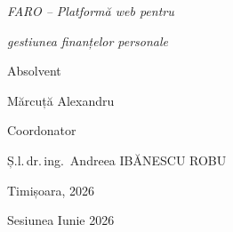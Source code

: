 \documentclass[12pt,a4paper,oneside]{report}
\begin{document}
\begin{titlepage}
  {\Large\itshape FARO -- Platformă web pentru\par}
  \vspace{0.15cm}
  {\Large\itshape gestiunea finanțelor personale\par}

  \vspace{2.2cm}

  \begin{flushright}
    {\large Absolvent\par}
    \vspace{0.1cm}
    {\large Mărcuță Alexandru\par}
  \end{flushright}

  \vspace{0.6cm}

  \begin{flushleft}
    {\large Coordonator\par}
    \vspace{0.1cm}
    {\large Ș.l.\,dr.\,ing.\ Andreea IBĂNESCU ROBU\par}
  \end{flushleft}

  \vfill

  {\large Timișoara, 2026\par}
  \vspace{0.15cm}
  {\large Sesiunea Iunie 2026\par}
\end{titlepage}

\setcounter{page}{3}

\renewcommand{\contentsname}{CUPRINS}
\tableofcontents
\thispagestyle{plain}

\newpage
\renewcommand{\listfigurename}{LISTA FIGURILOR}
\begingroup
\renewcommand{\addvspace}[1]{}%
\listoffigures
\endgroup
\thispagestyle{plain}

\newpage
\renewcommand{\listtablename}{LISTA TABELELOR}
\begingroup
\renewcommand{\addvspace}[1]{}%
\listoftables
\endgroup
\thispagestyle{plain}

\newpage
\begingroup
\renewcommand{\addvspace}[1]{}%
\lstlistoflistings
\endgroup
\thispagestyle{plain}
\end{document}
